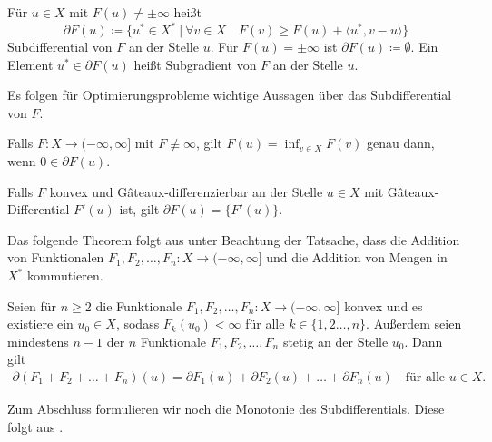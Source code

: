 \begin{definition}[Subdifferential]
  \label{def:subdifferential}
  Für $u\in X$ mit $F(u)\neq\pm\infty$ heißt
  \begin{equation}
    \label{eq:subdifferential}
    \partial F(u)\coloneqq
    \{u^\ast\in X^\ast\ |\ 
    \forall v\in X\quad F(v)\geq F(u)+\langle u^\ast,v-u\rangle\}  
  \end{equation}
  Subdifferential von $F$ an der Stelle $u$. Für $F(u)=\pm\infty$ ist
  $\partial F(u)\coloneq\emptyset$.
  Ein Element $u^\ast\in\partial F(u)$ heißt Subgradient von $F$ an der Stelle
  $u$.
\end{definition}

Es folgen für Optimierungsprobleme wichtige Aussagen über das Subdifferential 
von $F$.

\begin{theorem}
  \label{thm:extremalprinciple}
  Falls $F: X\to (-\infty,\infty]$ mit $F\nequiv\infty$, gilt
  $F(u)=\inf_{v\in X}F(v)$ genau dann, wenn $0\in\partial F(u)$.
\end{theorem}

\begin{theorem}[\protect{\cite[S. 387, Proposition 47.13 (i)]{Zei85}}]
  \label{thm:subdiffGateaux}
  Falls $F$ konvex und G\^{a}teaux-differenzierbar an der Stelle $u\in X$ mit
  G\^{a}teaux-Differential $F'(u)$ ist, gilt $\partial F(u)=\{F'(u)\}$.
\end{theorem}

Das folgende Theorem folgt aus \cite[S. 389, Theorem 47.B]{Zei85} unter 
Beachtung der Tatsache, dass die Addition von Funktionalen 
$F_1,F_2,\ldots,F_n:X\to (-\infty,\infty]$ und die Addition von
Mengen in $X^\ast$ kommutieren.

\begin{theorem}
  \label{thm:subdifferentialSumRule}
  Seien für $n\geq 2$ die Funktionale $F_1,F_2,\ldots,F_n: X\to
  (-\infty,\infty]$ konvex und es existiere ein $u_0\in X$, sodass
  $F_k(u_0)<\infty$ für alle $k\in\{1,2\ldots,n\}$. 
  Außerdem seien mindestens $n-1$ der $n$ Funktionale $F_1,F_2,\ldots,F_n$
  stetig an der Stelle $u_0$.
  Dann gilt 
  \begin{align*}
    \partial (F_1+F_2+\ldots+ F_n)(u) 
    = \partial F_1(u)+\partial F_2(u)+ \ldots + \partial F_n(u) \quad\text{für
    alle } u\in X.
  \end{align*}
\end{theorem}

Zum Abschluss formulieren wir noch die Monotonie des Subdifferentials.
Diese folgt aus \cite[S. 396 f., Definition 47.15, Theorem 47.F (1)]{Zei85}.


